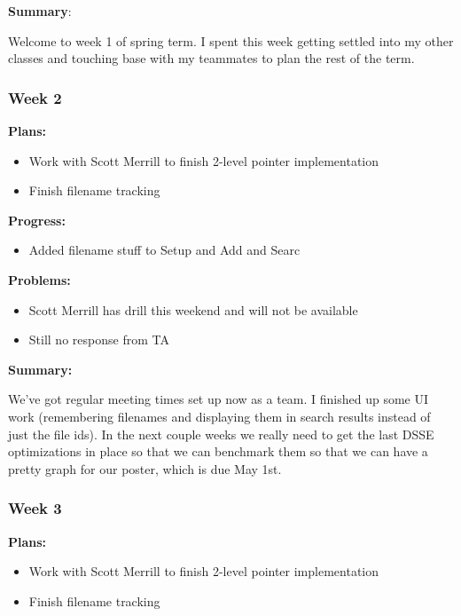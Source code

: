 \noindent \textbf{Summary}:

Welcome to week 1 of spring term. I spent this week getting settled into my other classes and touching base with my teammates to plan the rest of the term. 

\subsubsection{Week 2}

\noindent \textbf{Plans: }

\begin{itemize}
\item     Work with Scott Merrill to finish 2-level pointer implementation
\item     Finish filename tracking
\end{itemize}

\noindent \textbf{Progress: }

\begin{itemize}
\item     Added filename stuff to Setup and Add and Searc
\end{itemize}

\noindent \textbf{Problems: }

\begin{itemize}
\item     Scott Merrill has drill this weekend and will not be available
\item     Still no response from TA
\end{itemize}

\noindent \textbf{Summary: }

We've got regular meeting times set up now as a team. I finished up some UI work (remembering filenames and displaying them in search results instead of just the file ids). In the next couple weeks we really need to get the last DSSE optimizations in place so that we can benchmark them so that we can have a pretty graph for our poster, which is due May 1st.


\subsubsection{Week 3}

\noindent \textbf{Plans: }

\begin{itemize}
\item     Work with Scott Merrill to finish 2-level pointer implementation
\item     Finish filename tracking
\end{itemize}

